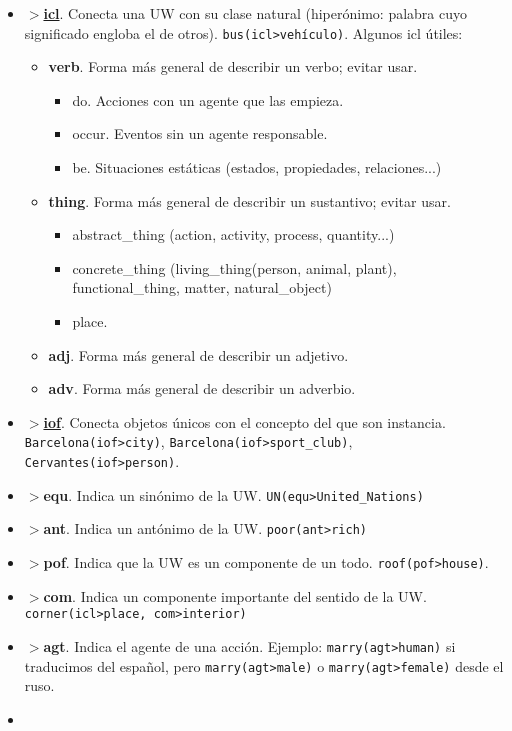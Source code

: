 \documentclass{article}
\begin{document}
\begin{multicols*}{3}
\begin{itemize}[itemsep=0pt, parsep=0pt, leftmargin=1em]
    \item \underline{\textbf{$>$icl}}. Conecta una UW con su clase natural (hiperónimo: palabra cuyo significado engloba el de otros). \verb+bus(icl>vehículo)+. Algunos icl útiles:
    \begin{itemize}[itemsep=0pt, parsep=0pt, leftmargin=1em]
        \item \textbf{verb}. Forma más general de describir un verbo; evitar usar.
        \begin{itemize}[itemsep=0pt, parsep=0pt, leftmargin=1em]
            \item do. Acciones con un agente que las empieza.
            \item occur. Eventos sin un agente responsable.
            \item be. Situaciones estáticas (estados, propiedades, relaciones...)
        \end{itemize}
        \item \textbf{thing}. Forma más general de describir un sustantivo; evitar usar.
        \begin{itemize}[itemsep=0pt, parsep=0pt, leftmargin=1em]
            \item abstract\_thing (action, activity, process, quantity...)
            \item concrete\_thing (living\_thing(person, animal, plant), functional\_thing, matter, natural\_object)
            \item place.
        \end{itemize}
        \item \textbf{adj}. Forma más general de describir un adjetivo.
        \item \textbf{adv}. Forma más general de describir un adverbio.
    \end{itemize}
    \item \underline{\textbf{$>$iof}}. Conecta objetos únicos con el concepto del que son instancia. \verb+Barcelona(iof>city)+, \verb+Barcelona(iof>sport_club)+, \verb+Cervantes(iof>person)+.
    \item \textbf{$>$equ}. Indica un sinónimo de la UW. \verb+UN(equ>United_Nations)+
    \item \textbf{$>$ant}. Indica un antónimo de la UW. \verb+poor(ant>rich)+
    \item \textbf{$>$pof}. Indica que la UW es un componente de un todo. \verb+roof(pof>house)+.
    \item \textbf{$>$com}. Indica un componente importante del sentido de la UW. \verb+corner(icl>place, com>interior)+
    \item \textbf{$>$agt}. Indica el agente de una acción. Ejemplo: \verb+marry(agt>human)+ si traducimos del español, pero \verb+marry(agt>male)+ o \verb+marry(agt>female)+ desde el ruso.
    \item   
\end{itemize}




\end{multicols*}
\end{document}
